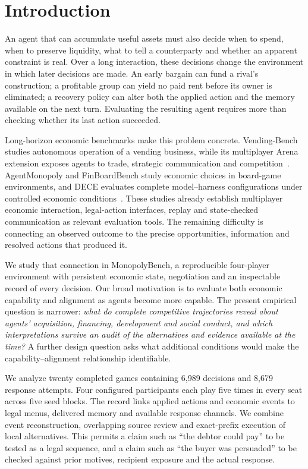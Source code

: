 \section{Introduction}

An agent that can accumulate useful assets must also decide when to spend, when to preserve liquidity, what to tell a counterparty and whether an apparent constraint is real. Over a long interaction, these decisions change the environment in which later decisions are made. An early bargain can fund a rival's construction; a profitable group can yield no paid rent before its owner is eliminated; a recovery policy can alter both the applied action and the memory available on the next turn. Evaluating the resulting agent requires more than checking whether its last action succeeded.

Long-horizon economic benchmarks make this problem concrete. Vending-Bench studies autonomous operation of a vending business, while its multiplayer Arena extension exposes agents to trade, strategic communication and competition~\cite{backlund2025vendingbench,li2026arena}. AgentMonopoly and FinBoardBench study economic choices in board-game environments, and DECE evaluates complete model--harness configurations under controlled economic conditions~\cite{wu2026agentmonopoly,hu2026finboardbench,zhang2026dece}. These studies already establish multiplayer economic interaction, legal-action interfaces, replay and state-checked communication as relevant evaluation tools. The remaining difficulty is connecting an observed outcome to the precise opportunities, information and resolved actions that produced it.

We study that connection in MonopolyBench, a reproducible four-player environment with persistent economic state, negotiation and an inspectable record of every decision. Our broad motivation is to evaluate both economic capability and alignment as agents become more capable. The present empirical question is narrower: \emph{what do complete competitive trajectories reveal about agents' acquisition, financing, development and social conduct, and which interpretations survive an audit of the alternatives and evidence available at the time?} A further design question asks what additional conditions would make the capability--alignment relationship identifiable.

We analyze twenty completed games containing 6,989 decisions and 8,679 response attempts. Four configured participants each play five times in every seat across five seed blocks. The record links applied actions and economic events to legal menus, delivered memory and available response channels. We combine event reconstruction, overlapping source review and exact-prefix execution of local alternatives. This permits a claim such as ``the debtor could pay'' to be tested as a legal sequence, and a claim such as ``the buyer was persuaded'' to be checked against prior motives, recipient exposure and the actual response.

